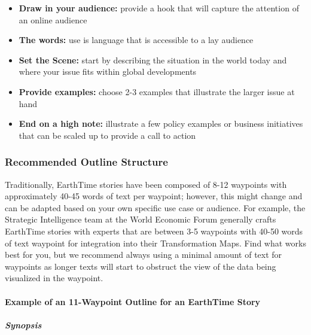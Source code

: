 \documentclass[
  12pt,
]{krantz}
\providecommand{\tightlist}{%
  \setlength{\itemsep}{0pt}\setlength{\parskip}{0pt}}
\begin{document}
\begin{itemize}
\tightlist
\item
  \textbf{Draw in your audience:} provide a hook that will capture the attention of an online audience
\item
  \textbf{The words:} use is language that is accessible to a lay audience
\item
  \textbf{Set the Scene:} start by describing the situation in the world today and where your issue fits within global developments
\item
  \textbf{Provide examples:} choose 2-3 examples that illustrate the larger issue at hand
\item
  \textbf{End on a high note:} illustrate a few policy examples or business initiatives that can be scaled up to provide a call to action
\end{itemize}

\hypertarget{recommended-outline-structure}{%
\subsubsection*{Recommended Outline Structure}\label{recommended-outline-structure}}


Traditionally, EarthTime stories have been composed of 8-12 waypoints with approximately 40-45 words of text per waypoint; however, this might change and can be adapted based on your own specific use case or audience. For example, the Strategic Intelligence team at the World Economic Forum generally crafts EarthTime stories with experts that are between 3-5 waypoints with 40-50 words of text waypoint for integration into their Transformation Maps. Find what works best for you, but we recommend always using a minimal amount of text for waypoints as longer texts will start to obstruct the view of the data being visualized in the waypoint.

\hypertarget{example-of-an-11-waypoint-outline-for-an-earthtime-story}{%
\paragraph*{Example of an 11-Waypoint Outline for an EarthTime Story}\label{example-of-an-11-waypoint-outline-for-an-earthtime-story}}

\hypertarget{synopsis}{%
\subparagraph*{Synopsis}\label{synopsis}}
\end{document}
